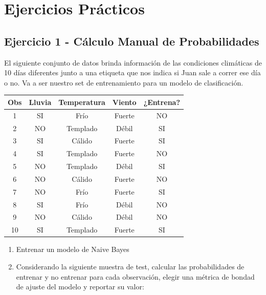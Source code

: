 \documentclass[12pt]{article}
\begin{document}
\section{Ejercicios Prácticos}

\subsection{Ejercicio 1 - Cálculo Manual de Probabilidades}

El siguiente conjunto de datos brinda información de las condiciones climáticas de 10 días diferentes junto a una etiqueta que nos indica si Juan sale a correr ese día o no. Va a ser nuestro set de entrenamiento para un modelo de clasificación.

\begin{table}[H]
    \centering
    \begin{tabular}{|c|c|c|c|c|}
        \hline
        \textbf{Obs} & \textbf{Lluvia} & \textbf{Temperatura} & \textbf{Viento} & \textbf{¿Entrena?} \\
        \hline
        1 & SI & Frío & Fuerte & NO \\
        \hline
        2 & NO & Templado & Débil & SI \\
        \hline
        3 & SI & Cálido & Fuerte & SI \\
        \hline
        4 & SI & Templado & Fuerte & NO \\
        \hline
        5 & NO & Templado & Débil & SI \\
        \hline
        6 & NO & Cálido & Fuerte & NO \\
        \hline
        7 & NO & Frío & Fuerte & SI \\
        \hline
        8 & SI & Frío & Débil & NO \\
        \hline
        9 & NO & Cálido & Débil & NO \\
        \hline
        10 & SI & Templado & Fuerte & SI \\
        \hline
    \end{tabular}
\end{table}

\begin{enumerate}
    \item[a.] Entrenar un modelo de Naive Bayes
    \item[b.] Considerando la siguiente muestra de test, calcular las probabilidades de entrenar y no entrenar para cada observación, elegir una métrica de bondad de ajuste del modelo y reportar su valor:
\end{enumerate}
\end{document}
